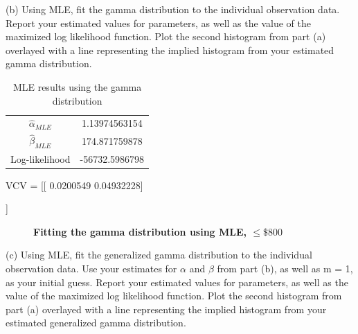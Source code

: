 \documentclass[letterpaper,12pt]{article}
\theoremstyle{definition}
\begin{document}
\noindent(b) Using MLE, fit the gamma distribution to the individual observation data. Report your estimated values for parameters, as well as the value of the maximized log likelihood function. Plot the second histogram from part (a) overlayed with a line representing the implied histogram from your estimated gamma distribution.
\par\bigskip

\begin{table}[h!]
 \centering
 \caption{MLE results using the gamma distribution}
 \begin{tabular}{|c | c |} 
  \hline
  $\hat{\alpha}_{MLE}$ & 1.13974563154\\ 
  $\hat{\beta}_{MLE}$ & 174.871759878\\
  Log-likelihood & -56732.5986798\\
  \hline
  \end{tabular}
\end{table}
\par
VCV =  [[ 0.0200549   0.04932228] \par
 [ 0.04932228  7.62538844]]
\par

\begin{figure}[H]\centering\captionsetup{width=4.0in}
  \caption{\textbf{Fitting the gamma distribution using MLE, $\leq \$800$}}
\end{figure}
\par\bigskip

\noindent(c) Using MLE, fit the generalized gamma distribution to the individual observation data. Use your estimates for $\alpha$ and $\beta$ from part (b), as well as m = 1, as your initial guess. Report your estimated values for parameters, as well as the value of the maximized log likelihood function. Plot the second histogram from part (a) overlayed with a line representing the implied histogram from your estimated generalized gamma distribution.
\par\bigskip
\end{document}
